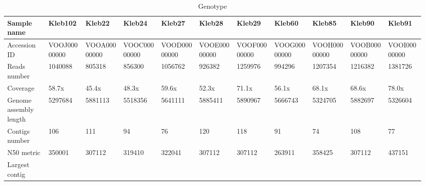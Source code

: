 \begin{table}\label{tab:genotype}
\begin{threeparttable}
\tiny

\caption{Genotype}

\begin{tabular}{lllllllllll}
\toprule
            Sample name &         Kleb102 &                           Kleb22 &        Kleb24 &           Kleb27 &                Kleb28 &                Kleb29 &                           Kleb60 &           Kleb85 &                           Kleb90 &           Kleb91 \\
\midrule
           Accession ID &    VOOJ00000000 &                     VOOA00000000 &  VOOC00000000 &     VOOD00000000 &          VOOE00000000 &          VOOF00000000 &                     VOOG00000000 &     VOOH00000000 &                     VOOB00000000 &     VOOI00000000 \\
           Reads number &         1040088 &                           805318 &        856300 &          1056762 &                926382 &               1259976 &                           994296 &          1207354 &                          1216382 &          1381726 \\
               Coverage &           58.7x &                            45.4x &         48.3x &            59.6x &                 52.3x &                 71.1x &                            56.1x &            68.1x &                            68.6x &            78.0x \\
 \mCL{Genome assembly\\
                length} &         5297684 &                          5881113 &       5518356 &          5641111 &               5885411 &               5890967 &                          5666743 &          5324705 &                          5882697 &          5326604 \\
         Contigs number &             106 &                              111 &            94 &               76 &                   120 &                   118 &                               91 &               74 &                              108 &               77 \\
             N50 metric &          350001 &                           307112 &        319410 &           322041 &                307112 &                307112 &                           263911 &           358425 &                           307112 &           437151 \\
  \mCL{Largest contig\\
}
\end{tabular}
\end{threeparttable}
\end{table}
